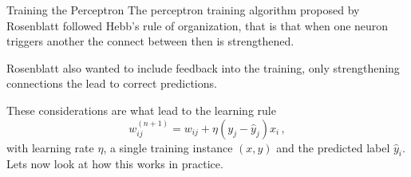 \documentclass[10pt, table, dvipsnames,xcdraw, handout]{beamer}
\begin{document}
\begin{frame}[fragile]{Training the Perceptron}
 The perceptron training algorithm proposed by Rosenblatt followed Hebb's rule of organization, that is that when one neuron triggers another the connect between then is strengthened. \pause

Rosenblatt also wanted to include feedback into the training, only strengthening connections the lead to correct predictions. \pause 

These considerations are what lead to the learning rule
$$
w_{ij}^{(n+1)} = w_{ij} + \eta(y_j-\hat y_j)x_i\,,
$$
with learning rate $\eta$, a single training instance $(x,y)$ and the predicted label $\hat{y}_i$. Lets now look at how this works in practice. 

\end{frame}
\end{document}
